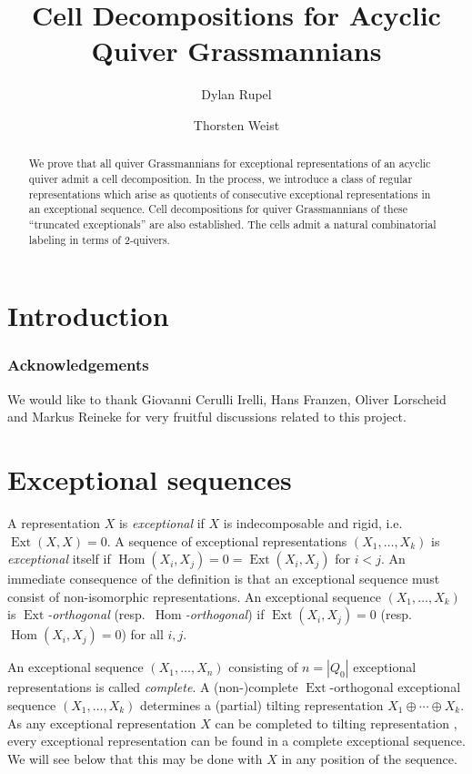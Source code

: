 \documentclass{amsart}
\title{Cell Decompositions for Acyclic Quiver Grassmannians}
\author{Dylan Rupel}
\author{Thorsten Weist}
\numberwithin{equation}{section}
\newcommand{\Ext}{\operatorname{Ext}}
\newcommand{\Hom}{\operatorname{Hom}}
\begin{document}
\begin{abstract}
  We prove that all quiver Grassmannians for exceptional representations of an acyclic quiver admit a cell decomposition.  
  In the process, we introduce a class of regular representations which arise as quotients of consecutive exceptional representations in an exceptional sequence.
  Cell decompositions for quiver Grassmannians of these ``truncated exceptionals'' are also established. 
  The cells admit a natural combinatorial labeling in terms of 2-quivers.
\end{abstract}

\setcounter{tocdepth}{2}

\maketitle

\tableofcontents
\section{Introduction}

\subsubsection*{Acknowledgements}
We would like to thank Giovanni Cerulli Irelli, Hans Franzen, Oliver Lorscheid and Markus Reineke for very fruitful discussions related to this project.



\section{Exceptional sequences}

A representation $X$ is \emph{exceptional} if $X$ is indecomposable and rigid, i.e.\ $\Ext(X,X)=0$.
A sequence of exceptional representations $(X_1,\ldots,X_k)$ is \emph{exceptional} itself if $\Hom(X_i,X_j)=0=\Ext(X_i,X_j)$ for $i<j$.
An immediate consequence of the definition is that an exceptional sequence must consist of non-isomorphic representations. 
An exceptional sequence $(X_1,\ldots,X_k)$ is \emph{$\Ext$-orthogonal} (resp.\ \emph{$\Hom$-orthogonal}) if $\Ext(X_i,X_j)=0$ (resp. $\Hom(X_i,X_j)=0$) for all $i,j$.

An exceptional sequence $(X_1,\ldots,X_n)$ consisting of $n=|Q_0|$ exceptional representations is called \emph{complete}.
A (non-)complete $\Ext$-orthogonal exceptional sequence $(X_1,\ldots,X_k)$ determines a (partial) tilting representation $X_1\oplus\cdots\oplus X_k$. 
As any exceptional representation $X$ can be completed to tilting representation \cite{???}, every exceptional representation can be found in a complete exceptional sequence.
We will see below that this may be done with $X$ in any position of the sequence. 
\end{document}
